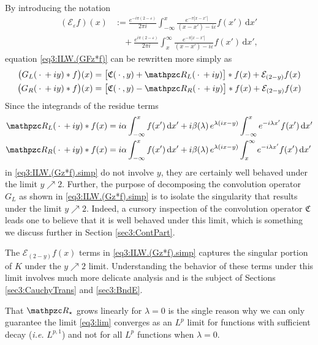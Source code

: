 \documentclass[../dissertation.tex]{subfiles}
\begin{document}
By introducing the notation\label{sym:almostExpCauchy}
\begin{align*}
	\left( \mathcal E_\varepsilon f \right)(x) 
		&:=  \frac{e^{-i \pi (2-\varepsilon)}}{2 \pi i} 
			\int_{-\infty}^x 
				\frac{e^{-\pi|x-x'|}}{(x-x') - i\varepsilon} f(x') 
			\, \mathrm{d}x' \\
		&\quad + \frac{e^{i \pi (2-\varepsilon)}}{2 \pi i} 
			\int_x^{\infty} 
				\frac{e^{-\pi|x-x'|} }{(x-x') - i\varepsilon} f(x') 
			\, \mathrm{d}x',
\end{align*}
equation \eqref{eq3:ILW.(GFz*f)} can be rewritten more simply as 
\begin{subequations}
	\label{eq3:ILW.(Gz*f).simp}
	\begin{align}
		\label{eq3:ILW.(GLz*f).simp}
		\big(G_L(\dotarg + iy)*f\big)(x) 
			&= \big[\mathfrak C(\dotarg, y) + \mathpzc R_L(\dotarg+iy)\big] * f(x) 
				+ \mathcal E_{(2-y)} f(x)
			\\
		\label{eq3:ILW.(GRz*f).simp}
		\big(G_R(\dotarg + iy)*f\big)(x) 
			&= \big[\mathfrak C(\dotarg, y) - \mathpzc R_R(\dotarg+iy) \big] * f(x) 
				+ \mathcal E_{(2-y)} f(x)
	\end{align}
\end{subequations}
Since the integrands of the residue terms
\begin{align*}
	\mathpzc R_L(\dotarg+iy)*f(x)
		&= i\alpha \int_{-\infty}^x f(x') \, \mathrm{d}x' 
		       + i\beta(\lambda) \, e^{\lambda(ix - y)}
		    		\int_{-\infty}^x e^{-i\lam x'} f(x')\, \mathrm{d}x' \\
	\mathpzc R_R(\dotarg+iy)*f(x)
		&=  i\alpha \int_{-\infty}^x f(x') \, \mathrm{d}x' 
		       + i\beta(\lambda) \, e^{\lambda(ix - y)}
		    		\int_x^{\infty} e^{-i\lam x'} f(x')\, \mathrm{d}x' 
\end{align*}
in \eqref{eq3:ILW.(Gz*f).simp} do not involve $y$, they are certainly well behaved 
under the limit $y \nearrow 2$. Further, the purpose of decomposing the convolution
operator $G_L$ as shown in \eqref{eq3:ILW.(Gz*f).simp} is to isolate the singularity that 
results under the limit $y \nearrow 2$. Indeed, a cursory inspection of the
convolution operator $\mathfrak C$ leads one to believe that it is well behaved under 
this limit, which 
is something we discuss further in Section \ref{sec3:ContPart}.

The $\mathcal E_{(2-y)} f(x)$ terms in \eqref{eq3:ILW.(Gz*f).simp} captures the singular 
portion of $K$ under the $y\nearrow 2$ limit. Understanding the behavior of these terms 
under this limit involves much more delicate analysis and is the subject of Sections 
\ref{sec3:CauchyTrans} and \ref{sec3:BndE}. 

\begin{rmk}
	That $\mathpzc R_\star$ grows linearly for $\lambda = 0$ is the single reason
	why we can only guarantee the limit \eqref{eq3:lim} converges as an $L^p$ limit 
	for functions with sufficient decay (\textit{i.e.} $L^{p,1}$) and not for all
	$L^p$ functions when $\lambda = 0$.
\end{rmk}
\end{document}
